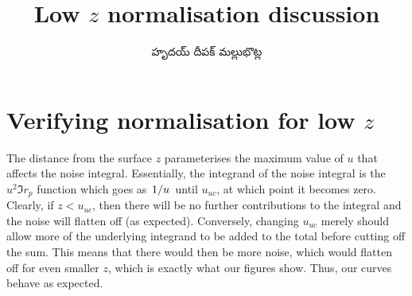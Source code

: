 \documentclass[../main.tex]{subfiles}
\title{Low $z$ normalisation discussion}
\author{\begin{telugu}హృదయ్ దీపక్ మల్లుభొట్ల\end{telugu}}
\date{}
\begin{document}
	\graphicspath{{\main/figures/}}

	\onlyinsubfile{\maketitle}

	\section{Verifying normalisation for low \texorpdfstring{$z$}{z}} \label{sec:lowz:norm}

	The distance from the surface $z$ parameterises the maximum value of $u$ that affects the noise integral.
	Essentially, the integrand of the noise integral is the $u^2 \Im r_p$ function which goes as $\flatfrac{1}{u}$ until $u_{uc}$, at which point it becomes zero.
	Clearly, if $z < u_{uc}$, then there will be no further contributions to the integral and the noise will flatten off (as expected).
	Conversely, changing $u_{uc}$ merely should allow more of the underlying integrand to be added to the total before cutting off the sum.
	This means that there would then be more noise, which would flatten off for even smaller $z$, which is exactly what our figures show.
	Thus, our curves behave as expected.
\end{document}
